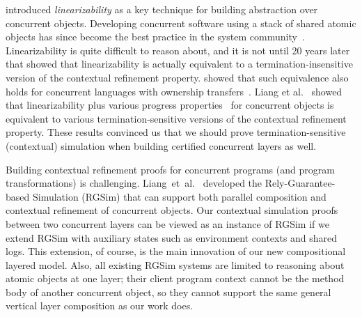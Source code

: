 \citet{herlihy90} introduced {\em linearizability} as a key technique
for building abstraction over concurrent objects. Developing
concurrent software using a stack of shared atomic objects has since
become the best practice in the system
community~\cite{Herlihy08book,ospp11}. Linearizability is quite
difficult to reason about, and it is not until 20 years later that
\citet{filipovic10} showed that linearizability is actually equivalent
to a termination-insensitive version of the contextual refinement
property. \citet{Gotsman12concur} showed that such equivalence also
holds for concurrent languages with ownership
transfers~\cite{ohearn:concur04}.  Liang et al.~\cite{liang13,lili16} showed that linearizability plus various
progress properties~\cite{Herlihy08book} for concurrent objects is
equivalent to various termination-sensitive versions of the contextual
refinement property. These results convinced us that we should prove
termination-sensitive (contextual) simulation when building certified
concurrent layers as well.

 Building contextual refinement proofs
for concurrent programs (and program transformations) is challenging.
Liang~{et~al.}~\cite{RGSim,Liang14lics,lili16} developed the
Rely-Guarantee-based Simulation (RGSim) that can support both parallel
composition and  contextual refinement of concurrent
objects. Our contextual simulation proofs between two concurrent
layers can be viewed as an instance of RGSim if we extend RGSim with
auxiliary states such as environment contexts and shared logs. This
extension, of course, is the main innovation of our new compositional
layered model. Also, all existing RGSim systems are limited to reasoning
about atomic objects at one layer; their client program context cannot
be the method body of another concurrent object, so they cannot
support the same general vertical layer composition as our work does.


